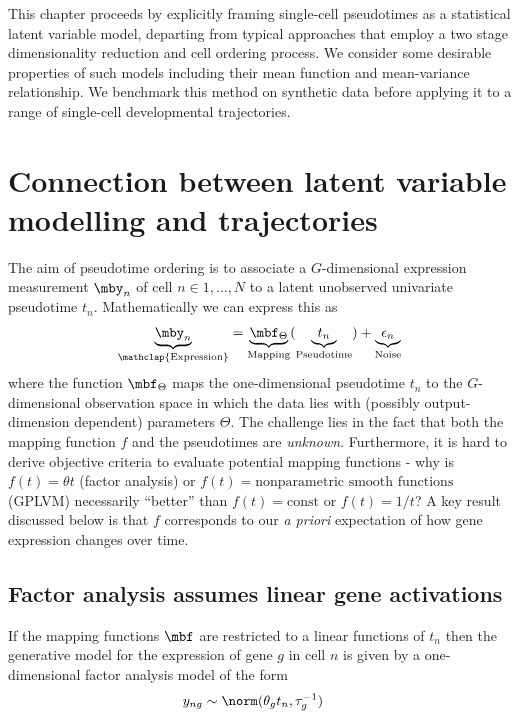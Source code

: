 This chapter proceeds by explicitly framing single-cell pseudotimes as a statistical latent variable model, departing from typical approaches that employ a two stage dimensionality reduction and cell ordering process. We consider some desirable properties of such models including their mean function and mean-variance relationship. We benchmark this method on synthetic data before applying it to a range of single-cell developmental trajectories.


\section{Connection between latent variable modelling and trajectories} \label{sec:latvar}

The aim of pseudotime ordering is to associate a $G$-dimensional expression measurement $\mby_n$ of cell $n \in 1, \ldots, N$ to a latent unobserved univariate pseudotime $t_n$. Mathematically we can express this as
\begin{align}
 \underbrace{\mby_n}_{\mathclap{\text{Expression}}} = \underbrace{\mbf_\Theta}_{\text{Mapping}}(\underbrace{t_n}_{\text{Pseudotime}}) + \underbrace{\epsilon_n}_{\text{Noise}}
 \label{eq:master_eq}
\end{align}
where the function $\mbf_\Theta$ maps the one-dimensional pseudotime $t_n$ to the $G$-dimensional observation space in which the data lies with (possibly output-dimension dependent) parameters $\Theta$. The challenge lies in the fact that both the mapping function $f$ and the pseudotimes are \emph{unknown}. Furthermore, it is hard to derive objective criteria to evaluate potential mapping functions - why is $f(t) = \theta t$ (factor analysis) or $f(t) = \text{nonparametric smooth functions}$ (GPLVM) necessarily ``better'' than $f(t) = \text{const}$ or $f(t) = 1 / t$? A key result discussed below is that $f$ corresponds to our \emph{a priori} expectation of how gene expression changes over time.


\subsection{Factor analysis assumes linear gene activations}

If the mapping functions $\mbf$ are restricted to a linear functions of $t_n$ then the generative model for the expression of gene $g$ in cell $n$ is given by a one-dimensional factor analysis model of the form
\begin{equation} \label{eq:fa}
	\begin{aligned}
		y_{ng} & \sim \norm(\theta_g t_n, \tau^{-1}_g)
	\end{aligned}
\end{equation}

